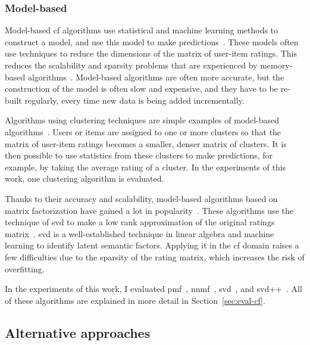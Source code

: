 \subsubsection{Model-based}
Model-based \gls{cf} algorithms use statistical and machine learning methods to construct a model, and use this model to make predictions~\cite{sharma2017collaborative, li2021novel,sarwar2002recommender,heckerman2000dependency}.
These models often use techniques to reduce the dimensions of the matrix of user-item ratings.
This reduces the scalability and sparsity problems that are experienced by memory-based algorithms~\cite{sarwar2002recommender,moreno2016web}.
Model-based algorithms are often more accurate, but the construction of the model is often slow and expensive, and they have to be re-built regularly, every time new data is being added incrementally.

Algorithms using clustering techniques are simple examples of model-based algorithms~\cite{su2009survey,breese2013empirical,sarwar2002recommender,o1999clustering}.
Users or items are assigned to one or more clusters so that the matrix of user-item ratings becomes a smaller, denser matrix of clusters.
It is then possible to use statistics from these clusters to make predictions, for example, by taking the average rating of a cluster.
In the experiments of this work, one clustering algorithm is evaluated.

Thanks to their accuracy and scalability, model-based algorithms based on matrix factorization have gained a lot in popularity~\cite{Ricci2010}.
These algorithms use the technique of \gls{svd} to make a low rank approximation of the original ratings matrix~\cite{george2005scalable, Ricci2010, Hug2020}.
\Gls{svd} is a well-established technique in linear algebra and machine learning to identify latent semantic factors.
Applying it in the \gls{cf} domain raises a few difficulties due to the sparsity of the rating matrix, which increases the risk of overfitting.

In the experiments of this work, I evaluated \gls{pmf}~\cite{mnih2008probabilistic}, \gls{nnmf}~\cite{wang2012nonnegative,hoyer2004non}, \gls{svd}~\cite{sarwar2000application,polat2005svd,Ricci2010}, and \gls{svd}++~\cite{koren2008factorization,Ricci2010}.
All of these algorithms are explained in more detail in Section~\ref{sec:eval-cf}.

\subsection{Alternative approaches}
\label{sec:cf-alternatives}

